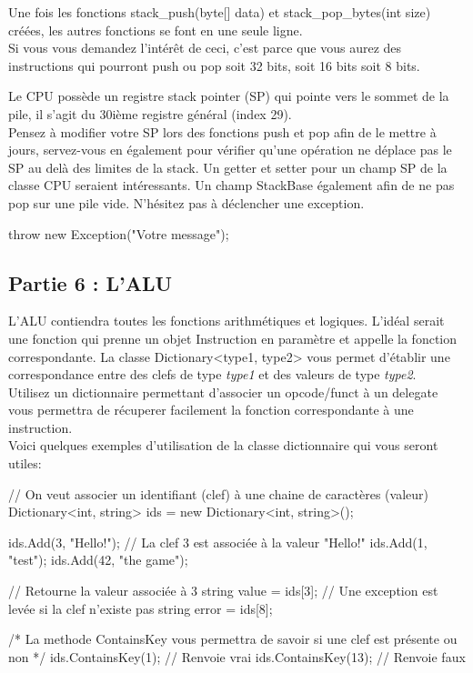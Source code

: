 Une fois les fonctions stack\_push(byte[] data) et stack\_pop\_bytes(int size)
créées, les autres fonctions se font en une seule ligne.\\ Si vous vous demandez
l'intérêt de ceci, c'est parce que vous aurez des instructions qui pourront push
ou pop soit 32 bits, soit 16 bits soit 8 bits.

Le CPU possède un registre stack pointer (SP) qui pointe vers le sommet de la
pile, il s'agit du 30ième registre général (index 29).\\ Pensez à modifier votre
SP lors des fonctions push et pop afin de le mettre à jours, servez-vous en
également pour vérifier qu'une opération ne déplace pas le SP au delà des
limites de la stack. Un getter et setter pour un champ SP de la classe CPU
seraient intéressants. Un champ StackBase également afin de ne pas pop sur une
pile vide. N'hésitez pas à déclencher une exception.
\begin{code}
  throw new Exception("Votre message");
\end{code}

\subsection{Partie 6 : L'ALU}

L'ALU contiendra toutes les fonctions arithmétiques et logiques. L'idéal serait
une fonction qui prenne un objet Instruction en paramètre et appelle la fonction
correspondante.  La classe Dictionary<type1, type2> vous permet d'établir une
correspondance entre des clefs de type \textit{type1} et des valeurs de type
\textit{type2}.\\ Utilisez un dictionnaire permettant d'associer un opcode/funct
à un delegate vous permettra de récuperer facilement la fonction correspondante
à une instruction.\\ Voici quelques exemples d'utilisation de la classe
dictionnaire qui vous seront utiles:
\begin{code}
  // On veut associer un identifiant (clef) à une chaine de caractères (valeur)
  Dictionary<int, string> ids = new Dictionary<int, string>();

  ids.Add(3, "Hello!"); // La clef 3 est associée à la valeur "Hello!"
  ids.Add(1, "test");
  ids.Add(42, "the game");

  // Retourne la valeur associée à 3
  string value = ids[3];
  // Une exception est levée si la clef n'existe pas
  string error = ids[8];

  /*
  La methode ContainsKey vous permettra de savoir si une clef est présente ou
  non
  */
  ids.ContainsKey(1); // Renvoie vrai
  ids.ContainsKey(13); // Renvoie faux
\end{code}
